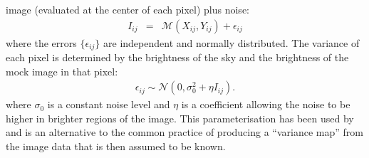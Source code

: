 \documentclass[12pt, preprint]{aastex}
\begin{document}
image (evaluated at the center of each pixel) plus noise:
\begin{eqnarray}
I_{ij} &=& \mathcal{M}(X_{ij}, Y_{ij}) + \epsilon_{ij}
\end{eqnarray}
where the errors $\{\epsilon_{ij}\}$ are independent and normally distributed.
The variance of each pixel is determined by the brightness of the sky and the
brightness of the mock image in that pixel:
\begin{eqnarray}
\epsilon_{ij} \sim \mathcal{N}(0, \sigma_0^2 + \eta I_{ij}).
\end{eqnarray}
where $\sigma_0$ is a constant noise level and $\eta$ is a coefficient allowing
the noise to be higher in brighter regions of the image.
This parameterisation has been used by \citet{2011MNRAS.412.2521B} and is an
alternative to the common practice of producing a ``variance map'' from the
image data that is then assumed to be known.
\end{document}
